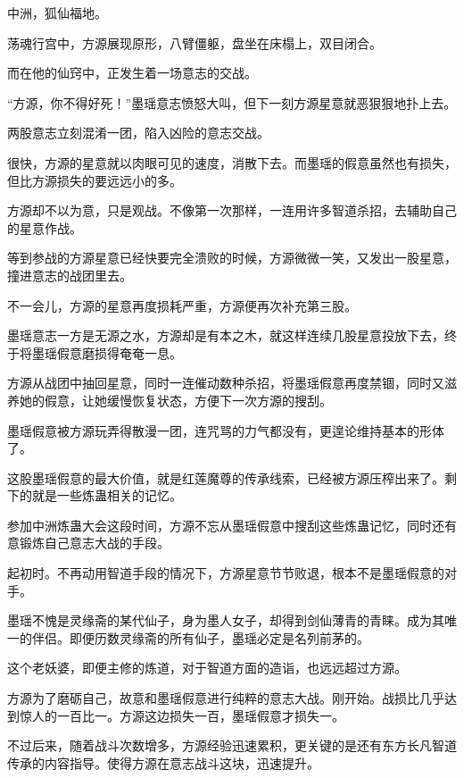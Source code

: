 
\begin{this_body}

中洲，狐仙福地。

荡魂行宫中，方源展现原形，八臂僵躯，盘坐在床榻上，双目闭合。

而在他的仙窍中，正发生着一场意志的交战。

“方源，你不得好死！”墨瑶意志愤怒大叫，但下一刻方源星意就恶狠狠地扑上去。

两股意志立刻混淆一团，陷入凶险的意志交战。

很快，方源的星意就以肉眼可见的速度，消散下去。而墨瑶的假意虽然也有损失，但比方源损失的要远远小的多。

方源却不以为意，只是观战。不像第一次那样，一连用许多智道杀招，去辅助自己的星意作战。

等到参战的方源星意已经快要完全溃败的时候，方源微微一笑，又发出一股星意，撞进意志的战团里去。

不一会儿，方源的星意再度损耗严重，方源便再次补充第三股。

墨瑶意志一方是无源之水，方源却是有本之木，就这样连续几股星意投放下去，终于将墨瑶假意磨损得奄奄一息。

方源从战团中抽回星意，同时一连催动数种杀招，将墨瑶假意再度禁锢，同时又滋养她的假意，让她缓慢恢复状态，方便下一次方源的搜刮。

墨瑶假意被方源玩弄得散漫一团，连咒骂的力气都没有，更遑论维持基本的形体了。

这股墨瑶假意的最大价值，就是红莲魔尊的传承线索，已经被方源压榨出来了。剩下的就是一些炼蛊相关的记忆。

参加中洲炼蛊大会这段时间，方源不忘从墨瑶假意中搜刮这些炼蛊记忆，同时还有意锻炼自己意志大战的手段。

起初时。不再动用智道手段的情况下，方源星意节节败退，根本不是墨瑶假意的对手。

墨瑶不愧是灵缘斋的某代仙子，身为墨人女子，却得到剑仙薄青的青睐。成为其唯一的伴侣。即便历数灵缘斋的所有仙子，墨瑶必定是名列前茅的。

这个老妖婆，即便主修的炼道，对于智道方面的造诣，也远远超过方源。

方源为了磨砺自己，故意和墨瑶假意进行纯粹的意志大战。刚开始。战损比几乎达到惊人的一百比一。方源这边损失一百，墨瑶假意才损失一。

不过后来，随着战斗次数增多，方源经验迅速累积，更关键的是还有东方长凡智道传承的内容指导。使得方源在意志战斗这块，迅速提升。


\end{this_body}
